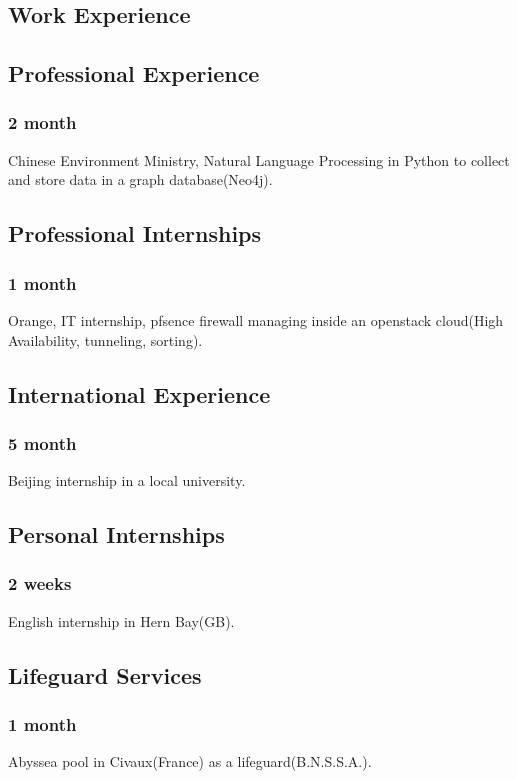 \documentclass{article}
\begin{document}
    \vspace{1cm}

    \begin{multicols}{2}
        \section{Work Experience}
            \subsection{Professional Experience}
                \subsubsection{2 month}
                    Chinese Environment Ministry, Natural Language Processing in Python to collect and store data in a graph database(Neo4j).
            \subsection{Professional Internships}
                \subsubsection{1 month}
                    Orange, IT internship, pfsence firewall managing inside an openstack cloud(High Availability, tunneling, sorting).
            \subsection{International Experience}
                \subsubsection{5 month}
                    Beijing internship in a local university.
            \subsection{Personal Internships}
                \subsubsection{2 weeks}
                    English internship in Hern Bay(GB).
            \subsection{Lifeguard Services}
                \subsubsection{1 month}
                    Abyssea pool in Civaux(France) as a lifeguard(B.N.S.S.A.).


\end{multicols}
\end{document}
